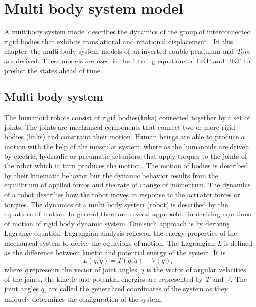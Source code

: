 \chapter{Multi body system model}
\label{ch:multi_mdl}
A multibody system model describes the dynamics of the group of interconnected rigid bodies that exhibits translational and rotational displacement \citep{mur94}. In this chapter, the multi body system models of an inverted double pendulum and \emph{Toro} are derived. These models are used in the filtering equations of EKF and UKF to predict the states ahead of time.
\section{Multi body system}
The humanoid robots consist of rigid bodies(links) connected together by a set of joints. The joints are mechanical components that connect two or more rigid bodies (links) and constraint their motion. Human beings are able to produce a motion with the help of the muscular system, where as the humanoids are driven by electric, hydraulic or pneumatic actuators, that apply torques to the joints of the robot which in turn produces the motion \cite[Chapter 2]{mur94}. The motion of bodies is described by their kinematic behavior but the dynamic behavior results from the equilibrium of applied forces and the rate of change of momentum. The dynamics of a robot describes how the robot moves in response to the actuator forces or torques. The dynamics of a multi body system (robot) is described by the equations of motion. In general there are several approaches in deriving equations of motion of rigid body dynamic system. One such approach is by deriving Lagrange equation. Lagrangian analysis relies on the energy properties of the mechanical system to derive the equations of motion. The Lagrangian \emph{L} is defined as the difference between kinetic and potential energy of the system. It is $$ L(q,\dot{q}) = T(q,\dot{q}) - V(q),$$ 
where \emph{q} represents the vector of joint angles, $\dot{q}$ is the vector of angular velocities of the joints, the kinetic and potential energies are represented by \emph{T} and \emph{V}. The joint angles $q_i$ are called the generalized coordinates of the system as they uniquely determines the configuration of the system.

